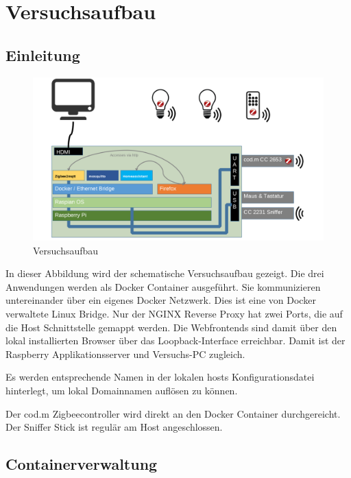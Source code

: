 \chapter{Versuchsaufbau}
\section{Einleitung}

\begin{figure}[H]
    \centering
    \includegraphics[width=1\textwidth]{media/Versuchsaufbau/image1.png}
    \caption{Versuchsaufbau}
  \end{figure}

In dieser Abbildung wird der schematische Versuchsaufbau gezeigt. Die drei Anwendungen werden als Docker Container ausgeführt. Sie kommunizieren
untereinander über ein eigenes Docker Netzwerk. Dies ist eine von Docker verwaltete Linux Bridge. Nur der NGINX Reverse Proxy hat zwei Ports, die
auf die Host Schnittstelle gemappt werden. Die Webfrontends sind damit über den lokal installierten Browser über das Loopback-Interface erreichbar. Damit ist der Raspberry Applikationsserver
und Versuchs-PC zugleich.

Es werden entsprechende Namen in der lokalen \grqq hosts\grqq{} Konfigurationsdatei hinterlegt, um lokal Domainnamen auflösen zu können.

Der cod.m Zigbeecontroller wird direkt an den Docker Container durchgereicht. Der Sniffer Stick ist regulär am Host angeschlossen. 

\section{Containerverwaltung}



